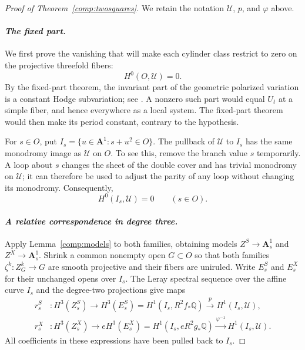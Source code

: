 \documentclass[11pt]{amsart}
\newcommand{\Q}{\mathbb Q}
\renewcommand{\AA}{\mathbf A}
\theoremstyle{definition}
\theoremstyle{remark}
\numberwithin{equation}{section}
\begin{document}
\begin{proof}[Proof of Theorem~\ref{comp:twosquares}]
We retain the notation $\mathscr U$, $p$, and $\varphi$ above.

\paragraph{\emph{The fixed part.}}
We first prove the vanishing that will make each cylinder class restrict
to zero on the projective threefold fibers:
\begin{equation}\label{comp:noinvariants}
 H^0(O,\mathscr U)=0.
\end{equation}
By the fixed-part theorem, the invariant part of the geometric polarized
variation is a constant Hodge subvariation; see
\cite[Theorem~4.1.1 and Corollary~4.1.2]{DeligneHodgeII}.  A nonzero such
part would equal $U_t$ at a simple fiber, and hence everywhere as a local
system.  The fixed-part theorem would then make its period constant,
contrary to the hypothesis.

For $s\in O$, put $I_s=\{u\in\AA^1:s+u^2\in O\}$.  The pullback of
$\mathscr U$ to $I_s$ has the same monodromy image as $\mathscr U$ on
$O$.  To see this, remove the branch value $s$ temporarily.  A loop about
$s$ changes the sheet of the double cover and has trivial monodromy on
$\mathscr U$; it can therefore be used to adjust the parity of any loop
without changing its monodromy.  Consequently,
\begin{equation}\label{comp:noinvariantsI}
 H^0(I_s,\mathscr U)=0\qquad(s\in O).
\end{equation}

\paragraph{\emph{A relative correspondence in degree three.}}
Apply Lemma~\ref{comp:models} to both families, obtaining models
$Z^S\to\AA^1_s$ and $Z^X\to\AA^1_s$.  Shrink a common nonempty open
$G\subset O$ so that both families $\zeta^k:Z_G^k\to G$ are smooth
projective and their fibers are uniruled.  Write $E_s^S$ and $E_s^X$ for
their unchanged opens
over $I_s$.  The Leray spectral sequence over the affine curve $I_s$
and the degree-two projections give maps
\begin{align*}
 r_s^S &:H^3(Z_s^S)\longrightarrow
 H^3(E_s^S)=H^1(I_s,R^2f_*\Q)
 \xrightarrow{p}H^1(I_s,\mathscr U),\\
 r_s^X &:H^3(Z_s^X)\longrightarrow
 eH^3(E_s^X)=H^1(I_s,eR^2g_*\Q)
 \xrightarrow{\varphi^{-1}}H^1(I_s,\mathscr U).
\end{align*}
All coefficients in these expressions have been pulled back to $I_s$.


\end{proof}
\end{document}

